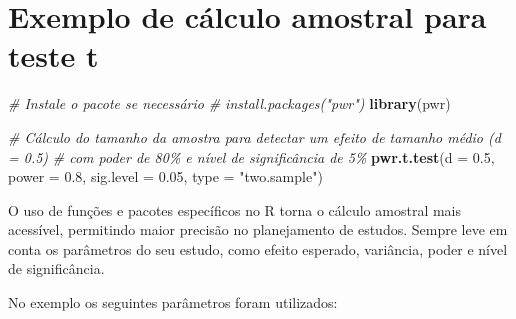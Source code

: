 \documentclass[
]{book}
\newenvironment{Shaded}{\begin{snugshade}}{\end{snugshade}}
\newcommand{\AttributeTok}[1]{\textcolor[rgb]{0.13,0.29,0.53}{#1}}
\newcommand{\CommentTok}[1]{\textcolor[rgb]{0.56,0.35,0.01}{\textit{#1}}}
\newcommand{\FloatTok}[1]{\textcolor[rgb]{0.00,0.00,0.81}{#1}}
\newcommand{\FunctionTok}[1]{\textcolor[rgb]{0.13,0.29,0.53}{\textbf{#1}}}
\newcommand{\NormalTok}[1]{#1}
\newcommand{\StringTok}[1]{\textcolor[rgb]{0.31,0.60,0.02}{#1}}
\begin{document}
\section{Exemplo de cálculo amostral para teste t}\label{exemplo-de-cuxe1lculo-amostral-para-teste-t}

\begin{Shaded}
\begin{Highlighting}[]
\CommentTok{\# Instale o pacote se necessário}
\CommentTok{\# install.packages("pwr")}
\FunctionTok{library}\NormalTok{(pwr)}

\CommentTok{\# Cálculo do tamanho da amostra para detectar um efeito de tamanho médio (d = 0.5)}
\CommentTok{\# com poder de 80\% e nível de significância de 5\%}
\FunctionTok{pwr.t.test}\NormalTok{(}\AttributeTok{d =} \FloatTok{0.5}\NormalTok{, }\AttributeTok{power =} \FloatTok{0.8}\NormalTok{, }\AttributeTok{sig.level =} \FloatTok{0.05}\NormalTok{, }\AttributeTok{type =} \StringTok{"two.sample"}\NormalTok{)}
\end{Highlighting}
\end{Shaded}

O uso de funções e pacotes específicos no R torna o cálculo amostral mais acessível, permitindo maior precisão no planejamento de estudos. Sempre leve em conta os parâmetros do seu estudo, como efeito esperado, variância, poder e nível de significância.

No exemplo os seguintes parâmetros foram utilizados:
\end{document}
